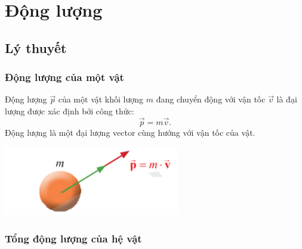 \let\lesson\undefined
\newcommand{\lesson}{\phantomlesson{Bài 19: Động lượng.}}
\chapter[Động lượng]{Động lượng}
\setcounter{section}{0}
\section{Lý thuyết}
\subsection{Động lượng của một vật}
\begin{minipage}{0.6\textwidth}
	Động lượng $\vec{p}$ của một vật khối lượng $m$ đang chuyển động với vận tốc $\vec{v}$ là đại lượng được xác định bởi công thức:
	\begin{equation*}
		\vec{p}=m\vec{v}.
	\end{equation*}
	Động lượng là một đại lượng vector cùng hướng với vận tốc của vật.
\end{minipage}
\begin{minipage}{0.4\textwidth}
	\begin{center}
		\includegraphics[scale=0.7]{../figs/G10-023-1}
	\end{center}
\end{minipage}

\subsection{Tổng động lượng của hệ vật}
